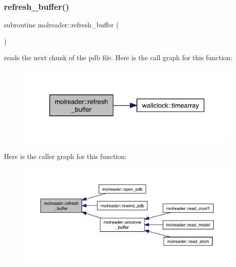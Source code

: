 \subsubsection{\texorpdfstring{refresh\+\_\+buffer()}{refresh\_buffer()}}
{\footnotesize\ttfamily subroutine molreader\+::refresh\+\_\+buffer (\begin{DoxyParamCaption}{ }\end{DoxyParamCaption})\hspace{0.3cm}{\ttfamily [private]}}

reads the next chunk of the pdb file. Here is the call graph for this function\+:\nopagebreak
\begin{figure}[H]
\begin{center}
\leavevmode
\includegraphics[width=318pt]{namespacemolreader_a16d4776fded57cf8aa38f639610cad84_cgraph}
\end{center}
\end{figure}
Here is the caller graph for this function\+:\nopagebreak
\begin{figure}[H]
\begin{center}
\leavevmode
\includegraphics[width=350pt]{namespacemolreader_a16d4776fded57cf8aa38f639610cad84_icgraph}
\end{center}
\end{figure}
\mbox{\label{namespacemolreader_a13131c46b34d0385ba7eadd0b1b88df9}} 
